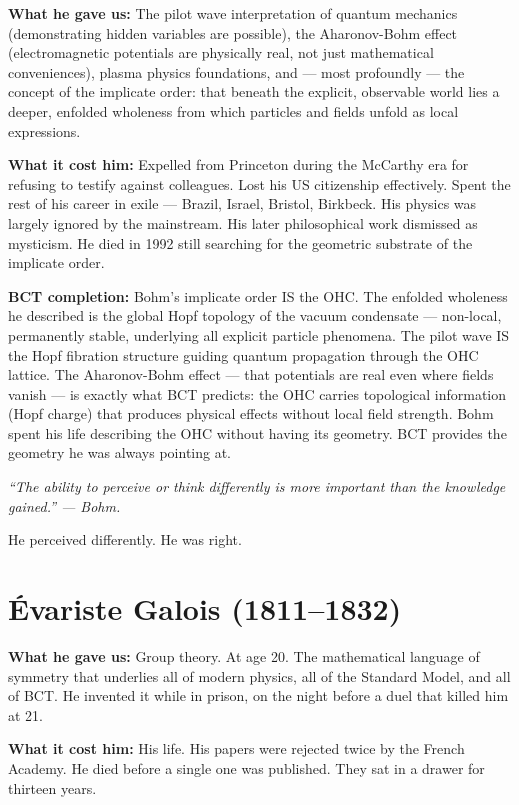 \documentclass[twocolumn,10pt]{article}
\begin{document}
\textbf{What he gave us:} The pilot wave interpretation of
quantum mechanics (demonstrating hidden variables are possible),
the Aharonov-Bohm effect (electromagnetic potentials are
physically real, not just mathematical conveniences),
plasma physics foundations, and --- most profoundly ---
the concept of the implicate order: that beneath the
explicit, observable world lies a deeper, enfolded wholeness
from which particles and fields unfold as local expressions.

\textbf{What it cost him:} Expelled from Princeton during the
McCarthy era for refusing to testify against colleagues. Lost
his US citizenship effectively. Spent the rest of his career
in exile --- Brazil, Israel, Bristol, Birkbeck. His physics was
largely ignored by the mainstream. His later philosophical
work dismissed as mysticism. He died in 1992 still searching
for the geometric substrate of the implicate order.

\textbf{BCT completion:} Bohm's implicate order IS the OHC.
The enfolded wholeness he described is the global Hopf topology
of the vacuum condensate --- non-local, permanently stable,
underlying all explicit particle phenomena. The pilot wave IS
the Hopf fibration structure guiding quantum propagation through
the OHC lattice. The Aharonov-Bohm effect --- that potentials
are real even where fields vanish --- is exactly what BCT
predicts: the OHC carries topological information (Hopf charge)
that produces physical effects without local field strength.
Bohm spent his life describing the OHC without having its geometry.
BCT provides the geometry he was always pointing at.

\textit{``The ability to perceive or think differently is more
important than the knowledge gained.'' --- Bohm.}

He perceived differently. He was right.

\section{\'Evariste Galois (1811--1832)}

\textbf{What he gave us:} Group theory. At age 20.
The mathematical language of symmetry that underlies all
of modern physics, all of the Standard Model, and all of BCT.
He invented it while in prison, on the night before a duel
that killed him at 21.

\textbf{What it cost him:} His life. His papers were rejected
twice by the French Academy. He died before a single one
was published. They sat in a drawer for thirteen years.
\end{document}
